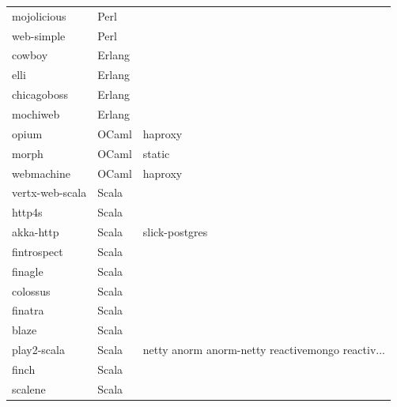 \begin{longtable}{lll}
    mojolicious      & Perl        &                                                    \\
    web-simple       & Perl        &                                                    \\
    cowboy           & Erlang      &                                                    \\
    elli             & Erlang      &                                                    \\
    chicagoboss      & Erlang      &                                                    \\
    mochiweb         & Erlang      &                                                    \\
    opium            & OCaml       & haproxy                                            \\
    morph            & OCaml       & static                                             \\
    webmachine       & OCaml       & haproxy                                            \\
    vertx-web-scala  & Scala       &                                                    \\
    http4s           & Scala       &                                                    \\
    akka-http        & Scala       & slick-postgres                                     \\
    fintrospect      & Scala       &                                                    \\
    finagle          & Scala       &                                                    \\
    colossus         & Scala       &                                                    \\
    finatra          & Scala       &                                                    \\
    blaze            & Scala       &                                                    \\
    play2-scala      & Scala       & netty anorm anorm-netty reactivemongo reactiv...   \\
    finch            & Scala       &                                                    \\
    scalene          & Scala       &                                                    \\

\end{longtable}
